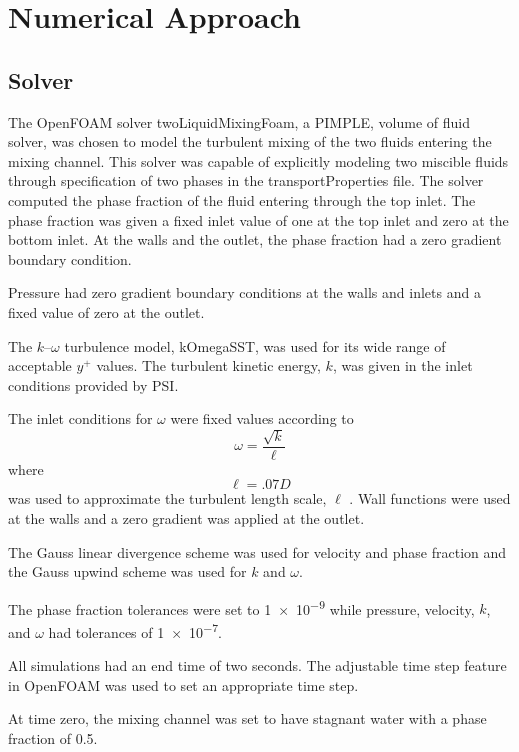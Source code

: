 \documentclass[11 pt]{article}
\begin{document}

\section{Numerical Approach}
\subsection{Solver}
	The OpenFOAM solver twoLiquidMixingFoam, a PIMPLE, volume of fluid solver, was chosen to model the turbulent mixing of the two fluids entering the mixing channel. This solver was capable of explicitly modeling two miscible fluids through specification of two phases in the transportProperties file. The solver computed the phase fraction of the fluid entering through the top inlet. The phase fraction was given a fixed inlet value of one at the top inlet and zero at the bottom inlet. At the walls and the outlet, the phase fraction had a zero gradient boundary condition. 

	Pressure had zero gradient boundary conditions at the walls and inlets and a fixed value of zero at the outlet. 

	The $k$--$\omega$ turbulence model, kOmegaSST, was used for its wide range of acceptable $y^+$ values. The turbulent kinetic energy, $k$, was given in the inlet conditions provided by PSI. 

	The inlet conditions for $\omega$ were fixed values according to 
		\begin{equation}
			\omega = \frac{\sqrt{k}}{\ell}
		\end{equation}
	where 
		\begin{equation}
			\ell = .07 D
		\end{equation}
	was used to approximate the turbulent length scale, $\ell$ \cite{freeStreamEqs}. Wall functions were used at the walls and a zero gradient was applied at the outlet.  

	The Gauss linear divergence scheme was used for velocity and phase fraction and the Gauss upwind scheme was used for $k$ and $\omega$. 

	The phase fraction tolerances were set to \num{1e-9} while pressure, velocity, $k$, and $\omega$ had tolerances of \num{1e-7}. 

	All simulations had an end time of two seconds. The adjustable time step feature in OpenFOAM was used to set an appropriate time step. 

	At time zero, the mixing channel was set to have stagnant water with a phase fraction of 0.5. 
\end{document}
